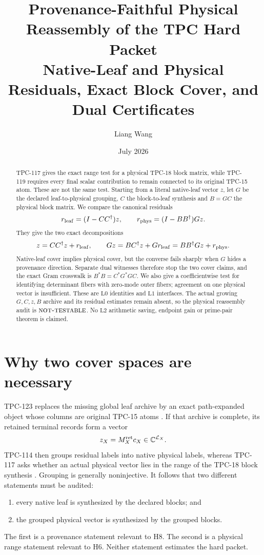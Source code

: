 \documentclass[11pt]{article}
\title{\textbf{Provenance-Faithful Physical Reassembly of the TPC Hard Packet}\\
\large Native-Leaf and Physical Residuals, Exact Block Cover, and
Dual Certificates}
\author{Liang Wang}
\date{July 2026}
\theoremstyle{definition}
\theoremstyle{remark}
\newcommand{\C}{\mathbb C}
\newcommand{\cL}{\mathcal L}
\newcommand{\Lzero}{\mathrm{L0}}
\newcommand{\Lone}{\mathrm{L1}}
\newcommand{\Ltwo}{\mathrm{L2}}
\newcommand{\NT}{\textsc{not-testable}}
\begin{document}
\maketitle

\begin{abstract}
TPC-117 gives the exact range test for a physical TPC-18 block
matrix, while TPC-119 requires every final scalar contribution to
remain connected to its original TPC-15 atom.  These are not the same
test.  Starting from a literal native-leaf vector \(z\), let
\(G\) be the declared leaf-to-physical grouping, \(C\) the
block-to-leaf synthesis and \(B=GC\) the physical block matrix.  We
compare the canonical residuals
\[
 r_{\rm leaf}=(I-CC^\dagger)z,
 \qquad
 r_{\rm phys}=(I-BB^\dagger)Gz.
\]
They give the two exact decompositions
\[
 z=CC^\dagger z+r_{\rm leaf},
 \qquad
 Gz=BC^\dagger z+Gr_{\rm leaf}
     =BB^\dagger Gz+r_{\rm phys}.
\]
Native-leaf cover implies physical cover, but the converse fails
sharply when \(G\) hides a provenance direction.  Separate dual
witnesses therefore stop the two cover claims, and the exact Gram
crosswalk is \(B^*B=C^*G^*GC\).  We also give a coefficientwise test
for identifying determinant fibers with zero-mode outer fibers;
agreement on one physical vector is insufficient.  These are
\(\Lzero\) identities and \(\Lone\) interfaces.  The actual growing
\(G,C,z,B\) archive and its residual estimates remain absent, so the
physical reassembly audit is \(\NT\).  No \(\Ltwo\) arithmetic
saving, endpoint gain or prime-pair theorem is claimed.
\end{abstract}

\section{Why two cover spaces are necessary}

TPC-123 replaces the missing global leaf archive by an exact
path-expanded object whose columns are original TPC-15 atoms
\citep{WangTPC15,WangTPC123}.  If that archive is complete, its
retained terminal records form a vector
\[
 z_X=M_X^{\rm ret}c_X\in\C^{\cL_X}.
\]
TPC-114 then groups residual labels into native physical labels,
whereas TPC-117 asks whether an actual physical vector lies in the
range of the TPC-18 block synthesis
\citep{WangTPC114,WangTPC117}.  Grouping is generally noninjective.
It follows that two different statements must be audited:
\begin{enumerate}[label=(\roman*),leftmargin=2.2em]
\item every native leaf is synthesized by the declared blocks; and
\item the grouped physical vector is synthesized by the grouped
blocks.
\end{enumerate}
The first is a provenance statement relevant to H8.  The second is a
physical range statement relevant to H6.  Neither statement estimates
the hard packet.
\end{document}
